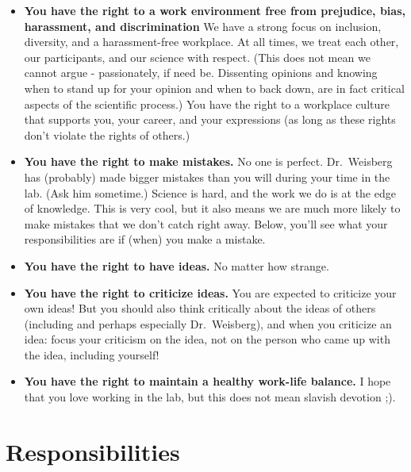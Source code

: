\documentclass[
  12pt,
]{book}
\begin{document}
\begin{itemize}
\item
  \textbf{You have the right to a work environment free from prejudice, bias, harassment, and discrimination}
  We have a strong focus on inclusion, diversity, and a harassment-free workplace. At all times, we treat each other, our participants, and our science with respect. (This does not mean we cannot argue - passionately, if need be. Dissenting opinions and knowing when to stand up for your opinion and when to back down, are in fact critical aspects of the scientific process.) You have the right to a workplace culture that supports you, your career, and your expressions (as long as these rights don't violate the rights of others.)
\item
  \textbf{You have the right to make mistakes.} No one is perfect. Dr.~Weisberg has (probably) made bigger mistakes than you will during your time in the lab. (Ask him sometime.) Science is hard, and the work we do is at the edge of knowledge. This is very cool, but it also means we are much more likely to make mistakes that we don't catch right away. Below, you'll see what your responsibilities are if (when) you make a mistake.
\item
  \textbf{You have the right to have ideas.} No matter how strange.
\item
  \textbf{You have the right to criticize ideas.} You are expected to criticize your own ideas! But you should also think critically about the ideas of others (including and perhaps especially Dr.~Weisberg), and when you criticize an idea: focus your criticism on the idea, not on the person who came up with the idea, including yourself!
\item
  \textbf{You have the right to maintain a healthy work-life balance.} I hope that you love working in the lab, but this does not mean slavish devotion ;).
\end{itemize}

\hypertarget{responsibilities}{%
\section{Responsibilities}\label{responsibilities}}
\end{document}

